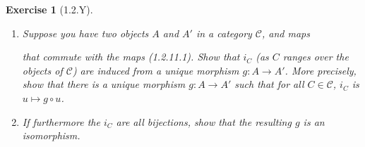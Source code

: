 \documentclass{amsart}
\newtheorem*{exercise*}{Exercise}
\begin{document}
\vspace{0.1in}


\begin{exercise*}[1.2.Y]
    \begin{enumerate}
        \item[(a)] Suppose you have two objects $A$ and $A'$ in a category $\mathscr{C}$, and maps
        \begin{center}
        \end{center}
        that commute with the maps (1.2.11.1). Show that $i_C$ (as $C$ ranges over the objects of $\mathscr{C}$) are induced from a unique morphism $g:A\rightarrow A'$. More precisely, show that there is a unique morphism $g:A\rightarrow A'$ such that for all $C\in \mathscr{C}$, $i_C$ is $u\mapsto g\circ u$. 

        \item[(b)] If furthermore the $i_C$ are all bijections, show that the resulting $g$ is an isomorphism.
    \end{enumerate}
\end{exercise*}

\vspace{0.1in}
\end{document}
